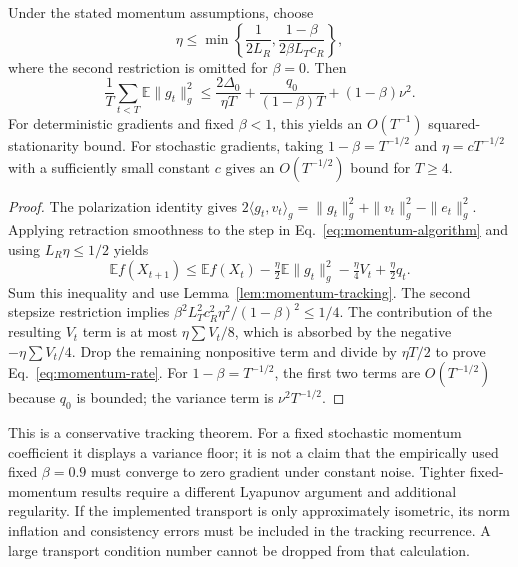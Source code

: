 \begin{theorem}
\label{thm:momentum}
Under the stated momentum assumptions, choose
\begin{equation}
 \eta\leq\min\left\{\frac1{2L_R},
 \frac{1-\beta}{2\beta L_Tc_R}\right\},
 \label{eq:momentum-step}
\end{equation}
where the second restriction is omitted for $\beta=0$. Then
\begin{equation}
 \frac1T\sum_{t<T}\mathbb E\|g_t\|_g^2
 \leq\frac{2\Delta_0}{\eta T}
       +\frac{q_0}{(1-\beta)T}+(1-\beta)\nu^2.
 \label{eq:momentum-rate}
\end{equation}
For deterministic gradients and fixed $\beta<1$, this yields an
$O(T^{-1})$ squared-stationarity bound. For stochastic gradients, taking
$1-\beta=T^{-1/2}$ and $\eta=cT^{-1/2}$ with a sufficiently small
constant $c$ gives an $O(T^{-1/2})$ bound for $T\geq4$.
\end{theorem}
\begin{proof}
The polarization identity gives
$2\langle g_t,v_t\rangle_g=\|g_t\|_g^2+\|v_t\|_g^2-\|e_t\|_g^2$.
Applying retraction smoothness to the step in
Eq.~\eqref{eq:momentum-algorithm} and using $L_R\eta\leq1/2$ yields
\begin{equation}
 \mathbb E f(X_{t+1})\leq\mathbb E f(X_t)
 -\tfrac\eta2\mathbb E\|g_t\|_g^2
 -\tfrac\eta4 V_t+\tfrac\eta2 q_t.
 \label{eq:momentum-descent}
\end{equation}
Sum this inequality and use Lemma~\ref{lem:momentum-tracking}.
The second stepsize restriction implies
$\beta^2L_T^2c_R^2\eta^2/(1-\beta)^2\leq1/4$.
The contribution of the resulting $V_t$ term is at most
$\eta\sum V_t/8$, which is absorbed by the negative
$-\eta\sum V_t/4$. Drop the remaining nonpositive term and divide by
$\eta T/2$ to prove Eq.~\eqref{eq:momentum-rate}.
For $1-\beta=T^{-1/2}$, the first two terms are $O(T^{-1/2})$ because
$q_0$ is bounded; the variance term is $\nu^2T^{-1/2}$.
\end{proof}

This is a conservative tracking theorem. For a fixed stochastic momentum
coefficient it displays a variance floor; it is not a claim that the
empirically used fixed $\beta=0.9$ must converge to zero gradient under
constant noise. Tighter fixed-momentum results require a different
Lyapunov argument and additional regularity. If the implemented transport
is only approximately isometric, its norm inflation and consistency
errors must be included in the tracking recurrence. A large transport
condition number cannot be dropped from that calculation.

